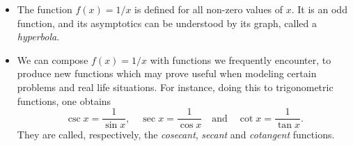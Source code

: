 \documentclass{ximera}
\begin{document}

\begin{summary}\begin{itemize}
\item The function $f(x) = 1/x$ is defined for all non-zero values of $x$. It is an odd function, and its asymptotics can be understood by its graph, called a \emph{hyperbola}.
\item We can compose $f(x) = 1/x$ with functions we frequently encounter, to produce new functions which may prove useful when modeling certain problems and real life situations. For instance, doing this to trigonometric functions, one obtains \[   \csc x = \frac{1}{\sin x}, \quad \sec x = \frac{1}{\cos x} \quad\mbox{and} \quad \cot x = \frac{1}{\tan x}.  \]They are called, respectively, the \emph{cosecant}, \emph{secant} and \emph{cotangent} functions.
\end{itemize}\end{summary}
\end{document}
